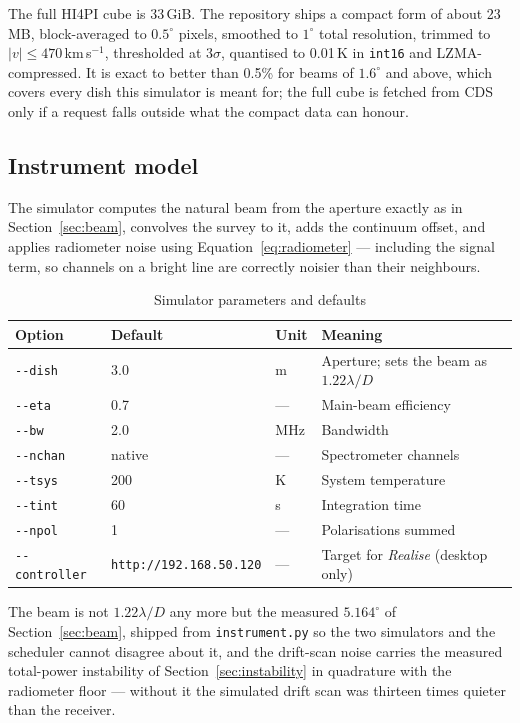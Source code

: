 \documentclass[11pt,a4paper]{article}
\begin{document}
The full HI4PI cube is 33\,GiB. The repository ships a compact form of about 23\,MB, block-averaged to $0.5^\circ$ pixels, smoothed to $1^\circ$ total resolution, trimmed to $|v| \le 470$\,km\,s$^{-1}$, thresholded at $3\sigma$, quantised to 0.01\,K in \texttt{int16} and LZMA-compressed. It is exact to better than 0.5\% for beams of $1.6^\circ$ and above, which covers every dish this simulator is meant for; the full cube is fetched from CDS only if a request falls outside what the compact data can honour.

\subsection{Instrument model}

The simulator computes the natural beam from the aperture exactly as in Section~\ref{sec:beam}, convolves the survey to it, adds the continuum offset, and applies radiometer noise using Equation~\eqref{eq:radiometer} --- including the signal term, so channels on a bright line are correctly noisier than their neighbours.

\begin{table}[H]
\centering
\caption{Simulator parameters and defaults}
\begin{tabular}{llll}
\toprule
\textbf{Option} & \textbf{Default} & \textbf{Unit} & \textbf{Meaning} \\
\midrule
\texttt{-{}-dish} & 3.0 & m & Aperture; sets the beam as $1.22\lambda/D$ \\
\texttt{-{}-eta} & 0.7 & --- & Main-beam efficiency \\
\texttt{-{}-bw} & 2.0 & MHz & Bandwidth \\
\texttt{-{}-nchan} & native & --- & Spectrometer channels \\
\texttt{-{}-tsys} & 200 & K & System temperature \\
\texttt{-{}-tint} & 60 & s & Integration time \\
\texttt{-{}-npol} & 1 & --- & Polarisations summed \\
\texttt{-{}-controller} & \texttt{http://192.168.50.120} & --- & Target for \emph{Realise} (desktop only) \\
\bottomrule
\end{tabular}
\end{table}

The beam is not $1.22\lambda/D$ any more but the measured $5.164^\circ$ of Section~\ref{sec:beam}, shipped from \texttt{instrument.py} so the two simulators and the scheduler cannot disagree about it, and the drift-scan noise carries the measured total-power instability of Section~\ref{sec:instability} in quadrature with the radiometer floor --- without it the simulated drift scan was thirteen times quieter than the receiver.
\end{document}
